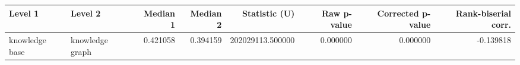\begin{tabular}{llrrrrrr}
\toprule
Level 1 & Level 2 & Median 1 & Median 2 & Statistic (U) & Raw p-value & Corrected p-value & Rank-biserial corr. \\
\midrule
knowledge base & knowledge graph & 0.421058 & 0.394159 & 202029113.500000 & 0.000000 & 0.000000 & -0.139818 \\
\bottomrule
\end{tabular}
